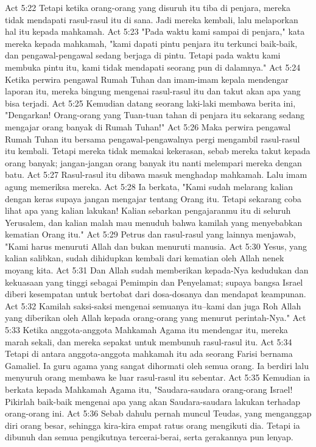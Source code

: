 Act 5:22  Tetapi ketika orang-orang yang disuruh itu tiba di penjara, mereka tidak mendapati rasul-rasul itu di sana. Jadi mereka kembali, lalu melaporkan hal itu kepada mahkamah.
Act 5:23  "Pada waktu kami sampai di penjara," kata mereka kepada mahkamah, "kami dapati pintu penjara itu terkunci baik-baik, dan pengawal-pengawal sedang berjaga di pintu. Tetapi pada waktu kami membuka pintu itu, kami tidak mendapati seorang pun di dalamnya."
Act 5:24  Ketika perwira pengawal Rumah Tuhan dan imam-imam kepala mendengar laporan itu, mereka bingung mengenai rasul-rasul itu dan takut akan apa yang bisa terjadi.
Act 5:25  Kemudian datang seorang laki-laki membawa berita ini, "Dengarkan! Orang-orang yang Tuan-tuan tahan di penjara itu sekarang sedang mengajar orang banyak di Rumah Tuhan!"
Act 5:26  Maka perwira pengawal Rumah Tuhan itu bersama pengawal-pengawalnya pergi mengambil rasul-rasul itu kembali. Tetapi mereka tidak memakai kekerasan, sebab mereka takut kepada orang banyak; jangan-jangan orang banyak itu nanti melempari mereka dengan batu.
Act 5:27  Rasul-rasul itu dibawa masuk menghadap mahkamah. Lalu imam agung memeriksa mereka.
Act 5:28  Ia berkata, "Kami sudah melarang kalian dengan keras supaya jangan mengajar tentang Orang itu. Tetapi sekarang coba lihat apa yang kalian lakukan! Kalian sebarkan pengajaranmu itu di seluruh Yerusalem, dan kalian malah mau menuduh bahwa kamilah yang menyebabkan kematian Orang itu."
Act 5:29  Petrus dan rasul-rasul yang lainnya menjawab, "Kami harus menuruti Allah dan bukan menuruti manusia.
Act 5:30  Yesus, yang kalian salibkan, sudah dihidupkan kembali dari kematian oleh Allah nenek moyang kita.
Act 5:31  Dan Allah sudah memberikan kepada-Nya kedudukan dan kekuasaan yang tinggi sebagai Pemimpin dan Penyelamat; supaya bangsa Israel diberi kesempatan untuk bertobat dari dosa-dosanya dan mendapat keampunan.
Act 5:32  Kamilah saksi-saksi mengenai semuanya itu--kami dan juga Roh Allah yang diberikan oleh Allah kepada orang-orang yang menurut perintah-Nya."
Act 5:33  Ketika anggota-anggota Mahkamah Agama itu mendengar itu, mereka marah sekali, dan mereka sepakat untuk membunuh rasul-rasul itu.
Act 5:34  Tetapi di antara anggota-anggota mahkamah itu ada seorang Farisi bernama Gamaliel. Ia guru agama yang sangat dihormati oleh semua orang. Ia berdiri lalu menyuruh orang membawa ke luar rasul-rasul itu sebentar.
Act 5:35  Kemudian ia berkata kepada Mahkamah Agama itu, "Saudara-saudara orang-orang Israel! Pikirlah baik-baik mengenai apa yang akan Saudara-saudara lakukan terhadap orang-orang ini.
Act 5:36  Sebab dahulu pernah muncul Teudas, yang menganggap diri orang besar, sehingga kira-kira empat ratus orang mengikuti dia. Tetapi ia dibunuh dan semua pengikutnya tercerai-berai, serta gerakannya pun lenyap.
